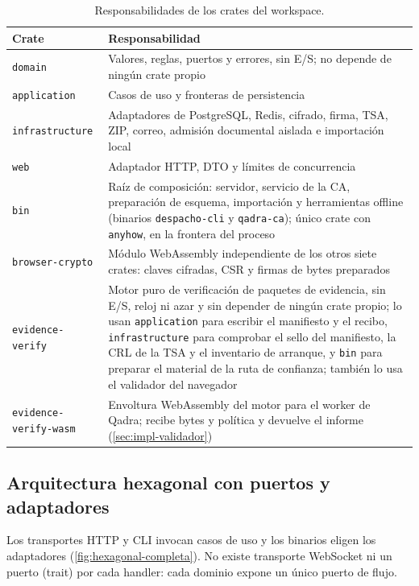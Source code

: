 \begin{table}[!htbp]
  \centering
  \caption{Responsabilidades de los crates del workspace.}
  \label{tab:impl-crates}
  \begin{tabularx}{\linewidth}{@{}l X@{}}
    \toprule
    \textbf{Crate} & \textbf{Responsabilidad} \\
    \midrule
    \texttt{domain} & Valores, reglas, puertos y errores, sin E/S; no depende de ningún crate propio \\
    \texttt{application} & Casos de uso y fronteras de persistencia \\
    \texttt{infrastructure} & Adaptadores de PostgreSQL, Redis, cifrado, firma, TSA, ZIP, correo, admisión documental aislada e importación local \\
    \texttt{web} & Adaptador HTTP, DTO y límites de concurrencia \\
    \texttt{bin} & Raíz de composición: servidor, servicio de la CA, preparación de esquema, importación y herramientas offline (binarios \texttt{despacho-cli} y \texttt{qadra-ca}); único crate con \texttt{anyhow}, en la frontera del proceso \\
    \texttt{browser-\allowbreak crypto} & Módulo WebAssembly independiente de los otros siete crates: claves cifradas, CSR y firmas de bytes preparados \\
    \texttt{evidence-\allowbreak verify} & Motor puro de verificación de paquetes de evidencia, sin E/S, reloj ni azar y sin depender de ningún crate propio; lo usan \texttt{application} para escribir el manifiesto y el recibo, \texttt{infrastructure} para comprobar el sello del manifiesto, la CRL de la TSA y el inventario de arranque, y \texttt{bin} para preparar el material de la ruta de confianza; también lo usa el validador del navegador \\
    \texttt{evidence-\allowbreak verify-\allowbreak wasm} & Envoltura WebAssembly del motor para el worker de Qadra; recibe bytes y política y devuelve el informe (\cref{sec:impl-validador}) \\
    \bottomrule
  \end{tabularx}
\end{table}

\subsection{Arquitectura hexagonal con puertos y adaptadores}\label{sec:hexagonal-completa}

Los transportes HTTP y CLI invocan casos de uso y los binarios eligen los adaptadores (\cref{fig:hexagonal-completa}). No existe transporte WebSocket ni un puerto (trait) por cada handler: cada dominio expone un único puerto de flujo.

